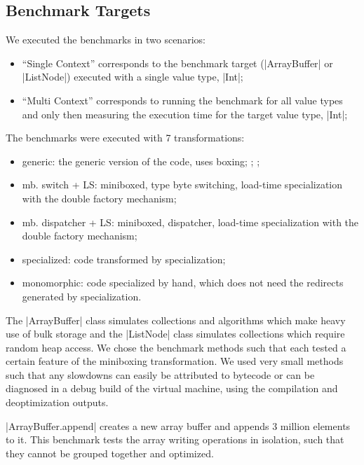\subsection{Benchmark Targets}
\label{mbox:subsec-eval-targets}

We executed the benchmarks in two scenarios:
\begin{itemize}
\item ``Single Context'' corresponds to the benchmark target (|ArrayBuffer| or |ListNode|) executed with a single value type, |Int|;
\item ``Multi Context'' corresponds to running the benchmark for all value types and only then measuring the execution time for the target value type, |Int|;
\end{itemize}

The benchmarks were executed with 7 transformations:
\begin{itemize}
\item {generic}: the generic version of the code, uses boxing;
;
;
\item {mb. switch + LS}: miniboxed, type byte switching, load-time specialization with the double factory mechanism;
\item {mb. dispatcher + LS}: miniboxed, dispatcher, load-time specialization with the double factory mechanism;
\item {specialized}: code transformed by specialization;
\item {monomorphic}: code specialized by hand, which does not need the redirects generated by specialization.
\end{itemize}


 The |ArrayBuffer| class simulates collections and algorithms which make heavy use of bulk storage and the |ListNode| class simulates collections which require random heap access. We chose the benchmark methods such that each tested a certain feature of the miniboxing transformation. We used very small methods such that any slowdowns can easily be attributed to bytecode or can be diagnosed in a debug build of the virtual machine, using the compilation and deoptimization outputs.

|ArrayBuffer.append| creates a new array buffer and appends 3 million elements to it. This benchmark tests the array writing operations in isolation, such that they cannot be grouped together and optimized.

